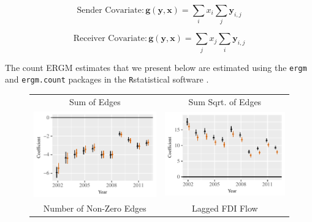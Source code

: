 \documentclass[12pt]{article}
\newcommand{\R}{\texttt{R}} %
\begin{document}
$$ \text{Sender Covariate}: \bm{g(y,x)} = \sum_{i}x_i \sum_{j} \bm{y}_{i,j}$$

$$ \text{Receiver Covariate}: \bm{g(y,x)} = \sum_{j}x_j \sum_{i} \bm{y}_{i,j}$$

\noindent The count ERGM estimates that we present below are estimated using the \texttt{ergm} \citep{ergm} and \texttt{ergm.count} \citep{ergmcount} packages in the \R \space statistical software \citep{r}.




\begin{figure}[htp]
\centering
\begin{tabular}{c@{\hskip -.4cm}c}
Sum of Edges&
Sum Sqrt. of Edges\\
\includegraphics[height=.22\textheight, clip=true, trim=0cm .5cm 0cm .1cm]{draft_figures/rl_plots/Sum.pdf}    &
\includegraphics[height=.22\textheight, clip=true, trim=.5cm .5cm 0cm .1cm]{draft_figures/rl_plots/Sum_5.pdf}   \\
Number of Non-Zero Edges &
Lagged FDI Flow\\

\end{tabular}
\end{figure}
\end{document}
